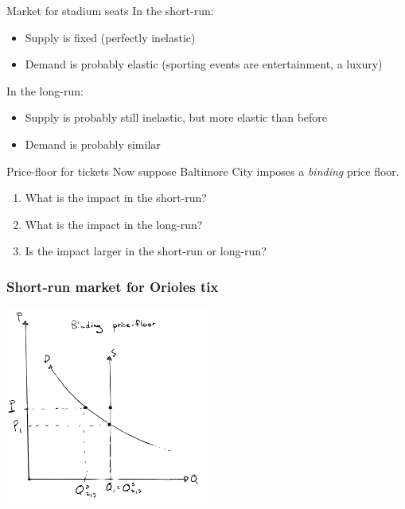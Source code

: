 \documentclass[aspectratio=169]{beamer}
\begin{document}
\begin{frame}{Market for stadium seats}
    In the short-run:
    \begin{itemize}
        \item Supply is fixed (perfectly inelastic)
        \item Demand is probably elastic (sporting events are entertainment, a luxury)
    \end{itemize}

    In the long-run:
    \begin{itemize}
        \item Supply is probably still inelastic, but more elastic than before
        \item Demand is probably similar
    \end{itemize}
\end{frame}

\begin{frame}{Price-floor for tickets}
    Now suppose Baltimore City imposes a \textit{binding} price floor.

    \begin{enumerate}
        \item What is the impact in the short-run?
        \item What is the impact in the long-run?
        \item Is the impact larger in the short-run or long-run?
    \end{enumerate}
\end{frame}

\begin{frame}
    \frametitle{Short-run market for Orioles tix}
    \centering
    \includegraphics[width = 0.5\textwidth,keepaspectratio]{Orioles_floor_short.png}
\end{frame}
\end{document}
